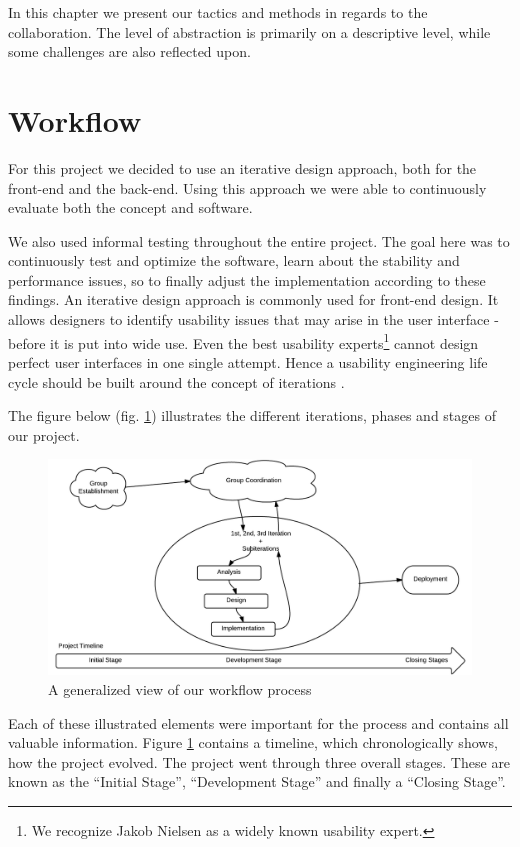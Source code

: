 In this chapter we present our tactics and methods in regards to the collaboration. The level of abstraction is primarily on a descriptive level, while some challenges are also reflected upon. 

\section{Workflow} \label{sec:workflow}
For this project we decided to use an iterative design approach, both for the front-end and the back-end. Using this approach we were able to continuously evaluate both the concept and software.

We also used informal testing throughout the entire project. The goal here was to continuously test and optimize the software, learn about the stability and performance issues, so to finally adjust the implementation according to these findings.  An iterative design approach is commonly used for front-end design. It allows designers to identify usability issues that may arise in the user interface - before it is put into wide use. Even the best usability experts\footnote{We recognize Jakob Nielsen as a widely known usability expert.} cannot design perfect user interfaces in one single attempt. Hence a usability engineering life cycle should be built around the concept of iterations \cite{Nielsen1993}.

The figure below (fig. \ref{fig:workflow}) illustrates the different iterations, phases and stages of our project.

\begin{figure}[ht]
\centering
\includegraphics[width=\columnwidth]{images/workflow.png}
\caption{A generalized view of our workflow process}
\label{fig:workflow}
\end{figure}

Each of these illustrated elements were important for the process and contains all valuable information. Figure \ref{fig:workflow} contains a timeline, which chronologically shows, how the project evolved. The project went through three overall stages. These are known as the ``Initial Stage'', ``Development Stage'' and finally a ``Closing Stage''.

